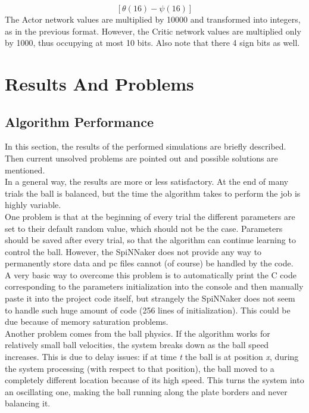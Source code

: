 \documentclass{article}
\begin{document}
\[
[\theta (16) - \psi (16)]
\]
The Actor network values are multiplied by 10000 and transformed into integers, as in the previous format. However, the Critic network values are multiplied only by 1000, thus occupying at most 10 bits. Also note that there 4 sign bits as well.


\section{Results And Problems}

\subsection{Algorithm Performance}
In this section, the results of the performed simulations are briefly described. Then current unsolved problems are pointed out and possible solutions are mentioned.\\

In a general way, the results are more or less satisfactory. At the end of many trials the ball is balanced, but the time the algorithm takes to perform the job is highly variable. \\
One problem is that at the beginning of every trial the different parameters are set to their default random value, which should not be the case. Parameters should be saved after every trial, so that the algorithm can continue learning to control the ball. However, the SpiNNaker does not provide any way to permanently store data and pc files cannot (of course) be handled by the code.\\
A very basic way to overcome this problem is to automatically print the C code corresponding to the parameters initialization into the console and then manually paste it into the project code itself, but strangely the SpiNNaker does not seem to handle such huge amount of code (256 lines of initialization). This could be due because of memory saturation problems.\\

Another problem comes from the ball physics. If the algorithm works for relatively small ball velocities, the system breaks down as the ball speed increases. This is due to delay issues: if at time \textit{t} the ball is at position \textit{x}, during the system processing (with respect to that position), the ball moved to a completely different location because of its high speed. This turns the system into an oscillating one, making the ball running along the plate borders and never balancing it.\\
\end{document}
